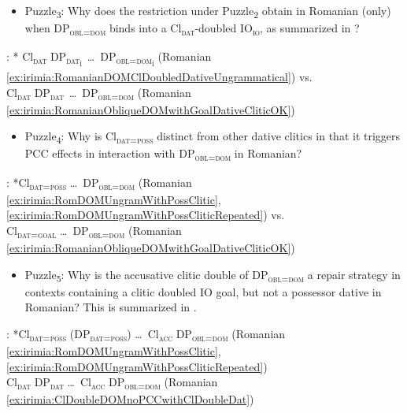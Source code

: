 \documentclass[output=paper,colorlinks,citecolor=brown,draft,draftmode]{langscibook}
\begin{document}
\begin{itemize}
\item {Puzzle\textsubscript{3}}:
Why does the restriction under Puzzle\textsubscript{2} obtain in Romanian (only) when
DP\textsubscript{\textsc{obl=dom}} binds into a Cl\textsubscript{\textsc{dat}}-doubled IO\textsubscript{\textsc{io}}, as summarized in
?
\end{itemize}

: * Cl\textsubscript{\textsc{dat}} DP\textsubscript{\textsc{dat}\textsubscript{i}}\ \ldots\, DP\textsubscript{\textsc{obl=dom}\textsubscript{i}} ({Romanian} \ref{ex:irimia:RomanianDOMClDoubledDativeUngrammatical}) vs. \\
\indent \hskip 1.6cm \Checkmark Cl\textsubscript{\textsc{dat}} DP\textsubscript{\textsc{dat}}\ \ldots\, DP\textsubscript{\textsc{obl=dom}} ({Romanian} \ref{ex:irimia:RomanianObliqueDOMwithGoalDativeCliticOK})
\label{ex:irimia:Puzzle3New}
\z

\begin{itemize}
\item {Puzzle\textsubscript{4}}: Why is Cl\textsubscript{\textsc{dat=poss}} distinct from other dative clitics in that it triggers PCC effects in interaction with DP\textsubscript{\textsc{obl=dom}} in Romanian?
\end{itemize}

: *Cl\textsubscript{\textsc{dat=poss}}  \ldots\, DP\textsubscript{\textsc{obl=dom}} ({Romanian} \ref{ex:irimia:RomDOMUngramWithPossClitic},  \ref{ex:irimia:RomDOMUngramWithPossCliticRepeated}) vs. \\
\indent \hskip 1.6cm \Checkmark Cl\textsubscript{\textsc{dat=goal}} \ldots\, DP\textsubscript{\textsc{obl=dom}} ({Romanian} \ref{ex:irimia:RomanianObliqueDOMwithGoalDativeCliticOK})
\z

\begin{itemize}

\item {Puzzle\textsubscript{5}}: Why is the accusative clitic double of DP\textsubscript{\textsc{obl=dom}} a repair strategy in contexts containing a clitic doubled IO goal, but not a possessor dative in Romanian? This is summarized in .

\end{itemize}

: *Cl\textsubscript{\textsc{dat=poss}} (DP\textsubscript{\textsc{dat=poss}}) \ldots\, Cl\textsubscript{\textsc{acc}} DP\textsubscript{\textsc{obl=dom}} ({Romanian} \ref{ex:irimia:RomDOMUngramWithPossClitic},  \ref{ex:irimia:RomDOMUngramWithPossCliticRepeated}) \\
\indent \hskip 1.6cm \Checkmark Cl\textsubscript{\textsc{dat}} DP\textsubscript{\textsc{dat}} \ldots\, Cl\textsubscript{\textsc{acc}} DP\textsubscript{\textsc{obl=dom}} ({Romanian} \ref{ex:irimia:ClDoubleDOMnoPCCwithClDoubleDat})
\label{ex:irimia:Puzzle4}
\end{document}
